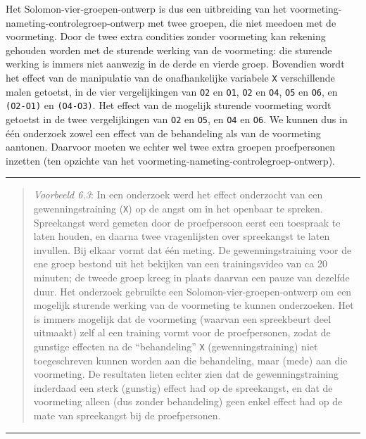 \documentclass[
]{book}
\begin{document}
Het Solomon-vier-groepen-ontwerp is dus een uitbreiding van het
voormeting-nameting-controlegroep-ontwerp met twee groepen, die niet
meedoen met de voormeting. Door de twee extra condities zonder
voormeting kan rekening gehouden worden met de sturende werking van de
voormeting: die sturende werking is immers niet aanwezig in de
derde en vierde groep. Bovendien wordt het effect van de manipulatie van
de onafhankelijke variabele \texttt{X} verschillende malen getoetst, in de vier
vergelijkingen van \texttt{O2} en \texttt{O1}, \texttt{O2} en \texttt{O4}, \texttt{O5} en \texttt{O6}, en
\texttt{(O2-O1)} en \texttt{(O4-O3)}. Het effect van de mogelijk sturende
voormeting wordt getoetst in de twee vergelijkingen van \texttt{O2} en \texttt{O5},
en \texttt{O4} en \texttt{O6}. We kunnen dus in één onderzoek zowel een effect van
de behandeling als van de voormeting aantonen. Daarvoor moeten we echter
wel twee extra groepen proefpersonen inzetten (ten opzichte van het
voormeting-nameting-controlegroep-ontwerp).

\begin{center}\rule{0.5\linewidth}{0.5pt}\end{center}

\begin{quote}
\emph{Voorbeeld 6.3}: In een onderzoek \citep{AHW00} werd het effect
onderzocht van een gewenningstraining (\texttt{X}) op de angst om in het
openbaar te spreken. Spreekangst werd gemeten door de proefpersoon eerst
een toespraak te laten houden, en daarna twee vragenlijsten over
spreekangst te laten invullen. Bij elkaar vormt dat één meting. De
gewenningstraining voor de ene groep bestond uit het bekijken van een
trainingsvideo van ca 20 minuten; de tweede groep kreeg in plaats
daarvan een pauze van dezelfde duur. Het onderzoek gebruikte een
Solomon-vier-groepen-ontwerp om een mogelijk sturende werking van de
voormeting te kunnen onderzoeken. Het is immers mogelijk dat de
voormeting (waarvan een spreekbeurt deel uitmaakt) zelf al een training
vormt voor de proefpersonen, zodat de gunstige effecten na de
``behandeling'' \texttt{X} (gewenningstraining) niet toegeschreven kunnen worden
aan die behandeling, maar (mede) aan die voormeting. De resultaten
lieten echter zien dat de gewenningstraining inderdaad een sterk
(gunstig) effect had op de spreekangst, en dat de voormeting alleen (dus
zonder behandeling) geen enkel effect had op de mate van spreekangst bij
de proefpersonen.
\end{quote}

\begin{center}\rule{0.5\linewidth}{0.5pt}\end{center}
\end{document}
